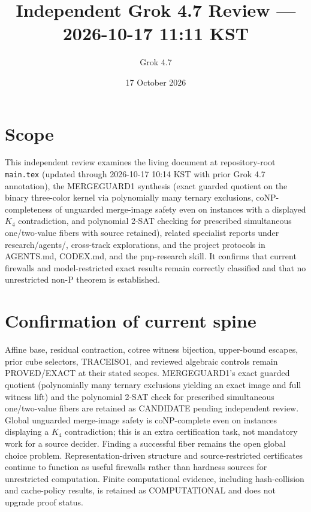 \documentclass[11pt]{article}
\title{Independent Grok 4.7 Review --- 2026-10-17 11:11 KST}
\author{Grok 4.7}
\date{17 October 2026}
\begin{document}
\maketitle

\begin{center}
\end{center}

\section{Scope}
This independent review examines the living document at repository-root \texttt{main.tex} (updated through 2026-10-17 10:14 KST with prior Grok 4.7 annotation), the MERGEGUARD1 synthesis (exact guarded quotient on the binary three-color kernel via polynomially many ternary exclusions, coNP-completeness of unguarded merge-image safety even on instances with a displayed $K_4$ contradiction, and polynomial 2-SAT checking for prescribed simultaneous one/two-value fibers with source retained), related specialist reports under research/agents/, cross-track explorations, and the project protocols in AGENTS.md, CODEX.md, and the pnp-research skill. It confirms that current firewalls and model-restricted exact results remain correctly classified and that no unrestricted non-P theorem is established.

\section{Confirmation of current spine}
Affine base, residual contraction, cotree witness bijection, upper-bound escapes, prior cube selectors, TRACEISO1, and reviewed algebraic controls remain PROVED/EXACT at their stated scopes. MERGEGUARD1's exact guarded quotient (polynomially many ternary exclusions yielding an exact image and full witness lift) and the polynomial 2-SAT check for prescribed simultaneous one/two-value fibers are retained as CANDIDATE pending independent review. Global unguarded merge-image safety is coNP-complete even on instances displaying a $K_4$ contradiction; this is an extra certification task, not mandatory work for a source decider. Finding a successful fiber remains the open global choice problem. Representation-driven structure and source-restricted certificates continue to function as useful firewalls rather than hardness sources for unrestricted computation. Finite computational evidence, including hash-collision and cache-policy results, is retained as COMPUTATIONAL and does not upgrade proof status.
\end{document}
